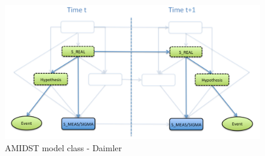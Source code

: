 \begin{figure}[ht!]
\begin{center}
\includegraphics[scale=0.39]{./figures/AMIDSTModelClassDaimler}
\caption{\label{Figure:AMIDSTModelClassDaimler} AMIDST model class - Daimler}
\end{center}
\end{figure}



%
%



